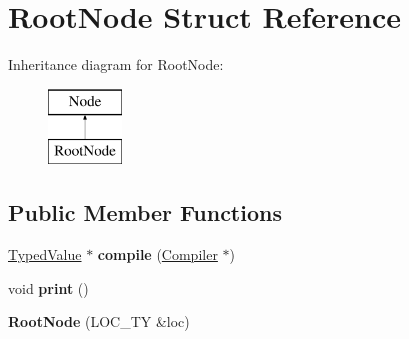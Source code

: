 \hypertarget{structRootNode}{}\section{Root\+Node Struct Reference}
\label{structRootNode}
Inheritance diagram for Root\+Node\+:\begin{figure}[H]
\begin{center}
\leavevmode
\includegraphics[height=2.000000cm]{structRootNode}
\end{center}
\end{figure}
\subsection*{Public Member Functions}
\begin{DoxyCompactItemize}
\item 
\mbox{\label{structRootNode_a9921ffd2752215074bb0ca89c8e00236}} 
\hyperlink{structTypedValue}{Typed\+Value} $\ast$ {\bfseries compile} (\hyperlink{structante_1_1Compiler}{Compiler} $\ast$)
\item 
\mbox{\label{structRootNode_a51164b78e8f7fb2156b9bbe70215493c}} 
void {\bfseries print} ()
\item 
\mbox{\label{structRootNode_a6b4ca93d6c9509cd047ae12bd1644177}} 
{\bfseries Root\+Node} (L\+O\+C\+\_\+\+TY \&loc)
\end{DoxyCompactItemize}
